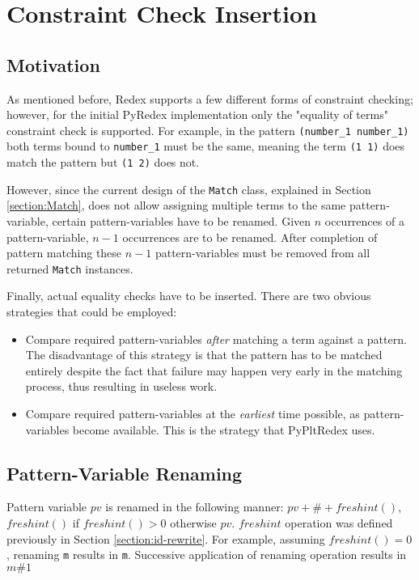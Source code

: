 \section{Constraint Check Insertion}
\label{section:constraint-check}
\subsection{Motivation}
As mentioned before, Redex supports a few different forms of constraint checking; however, for the initial PyRedex implementation only the "equality of terms" constraint check is supported. For example, in the pattern \texttt{(number\_1 number\_1)} both terms bound to \texttt{number\_1} must be the same, meaning the term \texttt{(1 1)} does match the pattern but \texttt{(1 2)} does not.

However, since the current design of the \texttt{Match} class, explained in Section \ref{section:Match}, does not allow assigning multiple terms to the same pattern-variable, certain pattern-variables have to be renamed. Given $n$ occurrences of a pattern-variable, $n-1$ occurrences are to be renamed. After completion of pattern matching these $n-1$ pattern-variables must be removed from all returned \texttt{Match} instances.

Finally, actual equality checks have to be inserted. There are two obvious strategies that could be employed:

\begin{itemize}
\item Compare required pattern-variables \textit{after} matching a term against a pattern. The disadvantage of this strategy is that the pattern has to be matched entirely despite the fact that failure may happen very early in the matching process, thus resulting in useless work.

\item Compare required pattern-variables at the \textit{earliest} time possible, as pattern-variables become available. This is the strategy that PyPltRedex uses.
\end{itemize}

\subsection{Pattern-Variable Renaming}
Pattern variable $pv$ is renamed in the following manner: $\mathit{pv + \# + freshint()}$, $\mathit{freshint()}$ if $\mathit{freshint() > 0}$ otherwise $pv$. $\mathit{freshint}$ operation was defined previously in Section \ref{section:id-rewrite}. For example, assuming $\mathit{freshint()=0}$, renaming \texttt{m} results in \texttt{m}. Successive application of renaming operation results in \texttt{$m\#1$}

